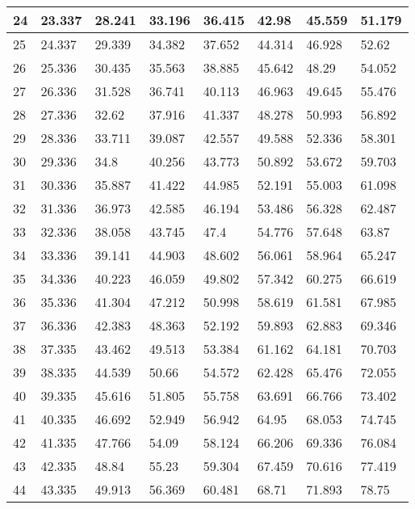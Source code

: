 \documentclass[letterpaper,10pt,english]{sphinxmanual}
\begin{document}
\begin{savenotes}
\begin{longtable}[c]{|l|l|l|l|l|l|l|l|}
\hline
24
&
23.337
&
28.241
&
33.196
&
36.415
&
42.98
&
45.559
&
51.179
\\
\hline
25
&
24.337
&
29.339
&
34.382
&
37.652
&
44.314
&
46.928
&
52.62
\\
\hline
26
&
25.336
&
30.435
&
35.563
&
38.885
&
45.642
&
48.29
&
54.052
\\
\hline
27
&
26.336
&
31.528
&
36.741
&
40.113
&
46.963
&
49.645
&
55.476
\\
\hline
28
&
27.336
&
32.62
&
37.916
&
41.337
&
48.278
&
50.993
&
56.892
\\
\hline
29
&
28.336
&
33.711
&
39.087
&
42.557
&
49.588
&
52.336
&
58.301
\\
\hline
30
&
29.336
&
34.8
&
40.256
&
43.773
&
50.892
&
53.672
&
59.703
\\
\hline
31
&
30.336
&
35.887
&
41.422
&
44.985
&
52.191
&
55.003
&
61.098
\\
\hline
32
&
31.336
&
36.973
&
42.585
&
46.194
&
53.486
&
56.328
&
62.487
\\
\hline
33
&
32.336
&
38.058
&
43.745
&
47.4
&
54.776
&
57.648
&
63.87
\\
\hline
34
&
33.336
&
39.141
&
44.903
&
48.602
&
56.061
&
58.964
&
65.247
\\
\hline
35
&
34.336
&
40.223
&
46.059
&
49.802
&
57.342
&
60.275
&
66.619
\\
\hline
36
&
35.336
&
41.304
&
47.212
&
50.998
&
58.619
&
61.581
&
67.985
\\
\hline
37
&
36.336
&
42.383
&
48.363
&
52.192
&
59.893
&
62.883
&
69.346
\\
\hline
38
&
37.335
&
43.462
&
49.513
&
53.384
&
61.162
&
64.181
&
70.703
\\
\hline
39
&
38.335
&
44.539
&
50.66
&
54.572
&
62.428
&
65.476
&
72.055
\\
\hline
40
&
39.335
&
45.616
&
51.805
&
55.758
&
63.691
&
66.766
&
73.402
\\
\hline
41
&
40.335
&
46.692
&
52.949
&
56.942
&
64.95
&
68.053
&
74.745
\\
\hline
42
&
41.335
&
47.766
&
54.09
&
58.124
&
66.206
&
69.336
&
76.084
\\
\hline
43
&
42.335
&
48.84
&
55.23
&
59.304
&
67.459
&
70.616
&
77.419
\\
\hline
44
&
43.335
&
49.913
&
56.369
&
60.481
&
68.71
&
71.893
&
78.75
\\
\hline
\end{longtable}\sphinxatlongtableend\end{savenotes}
\end{document}
